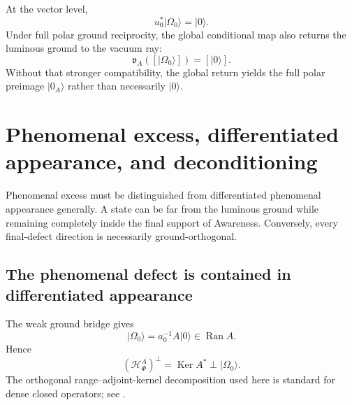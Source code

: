 \documentclass[11pt,reqno]{scrartcl}
\newcommand{\uzero}{u_{0}}
\newcommand{\ket}[1]{\lvert #1\rangle}
\DeclareMathOperator{\Ran}{Ran}
\DeclareMathOperator{\Ker}{Ker}
\newcommand{\defectHF}{(\mathscr H_{\Phi}^{A})^{\perp}}
\theoremstyle{plain}
\theoremstyle{definition}
\theoremstyle{remark}
\begin{document}
At the vector level,
\begin{equation}
  \uzero^*\ket{\Omega_0}=\ket0.
\end{equation}
Under full polar ground reciprocity, the global conditional map also returns
the luminous ground to the vacuum ray:
\begin{equation}
  \mathfrak v_A([\ket{\Omega_0}])=[\ket0].
  \label{eq:ground-global-actualization}
\end{equation}
Without that stronger compatibility, the global return yields the full polar
preimage $\ket{0_A}$ rather than necessarily $\ket0$.
\section{Phenomenal excess, differentiated appearance, and deconditioning}
\label{sec:phenomenal-excess-deconditioning}

Phenomenal excess must be distinguished from differentiated phenomenal
appearance generally.  A state can be far from the luminous ground while
remaining completely inside the final support of Awareness.  Conversely,
every final-defect direction is necessarily ground-orthogonal.

\subsection{The phenomenal defect is contained in differentiated appearance}

The weak ground bridge gives
\begin{equation}
  \ket{\Omega_0}=a_0^{-1}A\ket0\in\Ran A.
  \label{eq:ground-in-representable-range}
\end{equation}
Hence
\begin{equation}
  \defectHF=\Ker A^*\perp\ket{\Omega_0}.
  \label{eq:excess-ground-orthogonal}
\end{equation}
The orthogonal range--adjoint-kernel decomposition used here is standard for
dense closed operators; see \cite{Kato,ReedSimon}.
\end{document}

